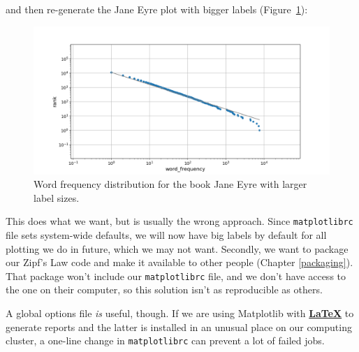\documentclass[
]{krantz}
\makeatletter
\newenvironment{Shaded}{\begin{snugshade}}{\end{snugshade}}
\newcommand{\BuiltInTok}[1]{#1}
\newcommand{\NormalTok}[1]{#1}
\newcommand{\OperatorTok}[1]{\textcolor[rgb]{0.81,0.36,0.00}{\textbf{#1}}}
\newenvironment{kframe}{%
\medskip{}
\setlength{\fboxsep}{.8em}
 \def\at@end@of@kframe{}%
 \ifinner\ifhmode%
  \def\at@end@of@kframe{\end{minipage}}%
  \begin{minipage}{\columnwidth}%
 \fi\fi%
 \def\FrameCommand##1{\hskip\@totalleftmargin \hskip-\fboxsep
 \colorbox{shadecolor}{##1}\hskip-\fboxsep
     \hskip-\linewidth \hskip-\@totalleftmargin \hskip\columnwidth}%
 \MakeFramed {\advance\hsize-\width
   \@totalleftmargin\z@ \linewidth\hsize
   \@setminipage}}%
 {\par\unskip\endMakeFramed%
 \at@end@of@kframe}
\renewenvironment{Shaded}{\begin{kframe}}{\end{kframe}}
\newcommand{\gref}[2]{\hyperlink{#2}{\textbf{#1}}}
\makeatother
\begin{document}
and then re-generate the Jane Eyre plot with bigger labels
(Figure~\ref{fig:configuration-jane-eyre-big-labels}):

\begin{Shaded}
\end{Shaded}

\begin{figure}

{\centering \includegraphics[width=1\linewidth]{figures/config/jane-eyre-big-labels} 

}

\caption{Word frequency distribution for the book Jane Eyre with larger label sizes.}\label{fig:configuration-jane-eyre-big-labels}
\end{figure}

This does what we want,
but is usually the wrong approach.
Since \texttt{matplotlibrc} file sets system-wide defaults,
we will now have big labels by default for all plotting we do in future,
which we may not want.
Secondly,
we want to package our Zipf's Law code and make it available to other people (Chapter \ref{packaging}).
That package won't include our \texttt{matplotlibrc} file,
and we don't have access to the one on their computer,
so this solution isn't as reproducible as others.

A global options file \emph{is} useful, though.
If we are using Matplotlib with \gref{LaTeX}{latex} to generate reports
and the latter is installed in an unusual place on our computing cluster,
a one-line change in \texttt{matplotlibrc} can prevent a lot of failed jobs.
\end{document}
